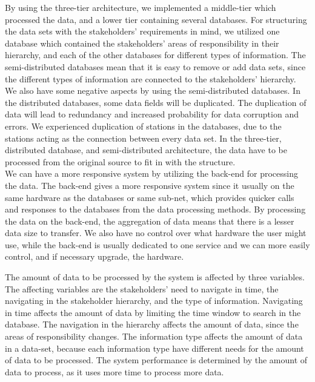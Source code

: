 By using the three-tier architecture, we implemented a middle-tier which 
processed the data, and a lower tier containing several databases. For
structuring the data sets with the stakeholders' requirements in mind, we
utilized one database which contained the stakeholders' areas of responsibility in
their hierarchy, and each of the other databases for different types of 
information. The semi-distributed databases mean that it is easy to remove or
add data sets, since the different types of information are connected to the
stakeholders' hierarchy. We also have some negative aspects by using
the semi-distributed databases. In the distributed databases, some data fields
will be duplicated. The duplication of data will lead to redundancy and
increased probability for data corruption and errors. We experienced
duplication of stations in the databases, due to the stations acting as the
connection between every data set. In the three-tier, distributed database, 
and semi-distributed architecture, the data have to be processed from the 
original source to fit in with the structure.\\

We can have a more responsive system by utilizing the back-end for processing 
the data. The back-end gives a more responsive system since it usually on the
same hardware as the databases or same sub-net, which provides quicker calls
and responses to the databases from the data processing methods. By processing 
the data on the back-end, the aggregation of data means that there is a lesser
data size to transfer. We also have no control over what hardware the user
might use, while the back-end is usually dedicated to one service and we can
more easily control, and if necessary upgrade, the hardware.

The amount of data to be processed by the system is affected by three 
variables. The affecting variables are the stakeholders' need to navigate in 
time, the navigating in the stakeholder hierarchy, and the type of information.
Navigating in time affects the amount of data by limiting the time window to 
search in the database. The navigation in the hierarchy affects the amount of
data, since the areas of responsibility changes. The information type affects the 
amount of data in a data-set, because each information type have different
needs for the amount of data to be processed. The system performance is
determined by the amount of data to process, as it uses more time to process 
more data. 

